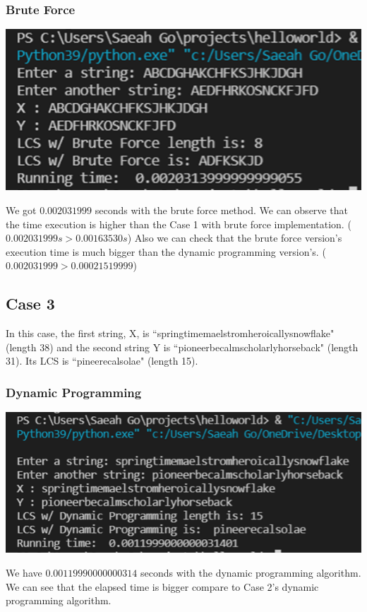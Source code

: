 \documentclass{article}
\begin{document}
\subsubsection{Brute Force}
\begin{center}
\includegraphics[scale = 0.7]{case2 BF.png} \\
\end{center}
We got $0.002031999$ seconds with the brute force method. We can observe that the time execution is higher than the Case 1 with brute force implementation. ($0.002031999s > 0.00163530s$) Also we can check that the brute force version's execution time is much bigger than the dynamic programming version's. ($0.002031999 > 0.00021519999$)

\subsection{\textbf{Case 3}} 
In this case, the first string, X, is ``springtimemaelstromheroicallysnowflake" (length 38) and the second string Y is ``pioneerbecalmscholarlyhorseback" (length 31). Its LCS is ``pineerecalsolae" (length 15).
\subsubsection{Dynamic Programming}
\begin{center}
\includegraphics[scale = 0.7]{case3 DP.png} \\
\end{center}
We have $0.00119990000000314$ seconds with the dynamic programming algorithm. We can see that the elapsed time is bigger compare to Case 2's dynamic programming algorithm. 
\end{document}
